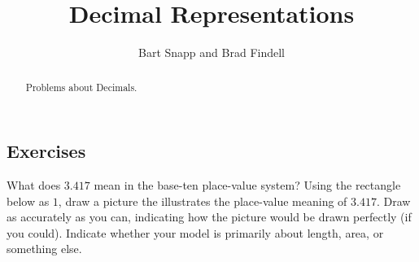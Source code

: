 \documentclass[nooutcomes]{ximera}
\title{Decimal Representations}
\author{Bart Snapp and Brad Findell}
\begin{document}
\begin{abstract}
Problems about Decimals.
\end{abstract}
\maketitle




\subsection*{Exercises}

\begin{problem}
What does $3.417$ mean in the base-ten place-value system?  Using the rectangle below as $1$, draw a picture the illustrates the place-value meaning of $3.417$.  Draw as accurately as you can, indicating how the picture would be drawn perfectly (if you could).  Indicate whether your model is primarily about length, area, or something else.  

\vspace{.5cm}
\end{problem}
\end{document}
